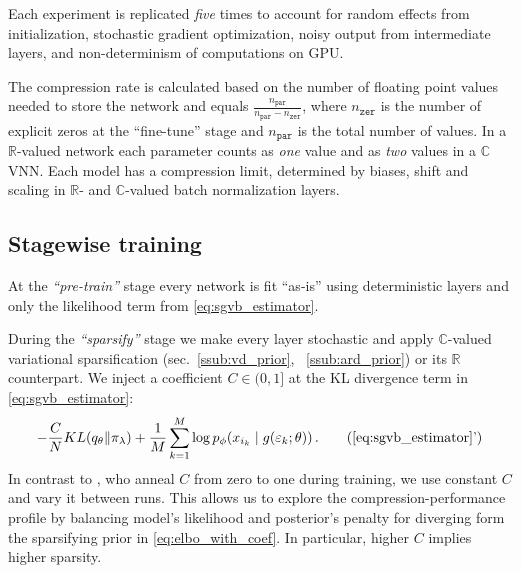 \documentclass[a4paper,10pt,twocolumn]{article}
\newcommand{\real}{\mathbb{R}}
\newcommand{\cplx}{\mathbb{C}}
\begin{document}
Each experiment is replicated \emph{five} times to account for random effects from
initialization, stochastic gradient optimization, noisy output from intermediate layers,
and non-determinism of computations on GPU.

The compression rate is calculated based on the number of floating point values needed
to store the network and equals $
  \tfrac{n_\mathtt{par}}{n_\mathtt{par} - n_\mathtt{zer}}
$, where $n_\mathtt{zer}$ is the number of explicit zeros at the ``fine-tune'' stage
and $n_\mathtt{par}$ is the total number of values. In a $\real$-valued network each
parameter counts as \emph{one} value and as \emph{two} values in a $\cplx$VNN. Each
model has a compression limit, determined by biases, shift and scaling in $\real$-
and $\cplx$-valued batch normalization layers.

\subsection{Stagewise training} %
\label{sub:staging}

At the \emph{``pre-train''} stage every network is fit ``as-is'' using deterministic layers
and only the likelihood term from \eqref{eq:sgvb_estimator}.

During the \emph{``sparsify''} stage we make every layer stochastic and apply $\cplx$-valued
variational sparsification (sec.~\ref{ssub:vd_prior}, ~\ref{ssub:ard_prior}) or its $\real$
counterpart. We inject a coefficient $
  C \in (0, 1]
$ at the KL divergence term in \eqref{eq:sgvb_estimator}:
\begin{equation}  \label{eq:elbo_with_coef}
  - \frac{C}N KL(q_{\theta} \| \pi_{\lambda})
  + \frac1{M} \sum_{k=1}^M
      \log p_{\phi}(x_{i_k} \mid g(\varepsilon_k; \theta))
  \,.
  \tag{\ref{eq:sgvb_estimator}'}
\end{equation}
In contrast to \cite{molchanov_variational_2017}, who anneal $C$ from zero to one during
training, we use constant $C$ and vary it between runs. This allows us to explore the
compression-performance profile by balancing model's likelihood and posterior's penalty
for diverging form the sparsifying prior in \eqref{eq:elbo_with_coef}. In particular,
higher $C$ implies higher sparsity.
\end{document}
